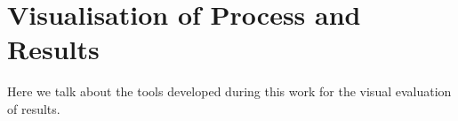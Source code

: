 \chapter{Visualisation of Process and Results}
Here we talk about the tools developed during this work for the visual evaluation of results.